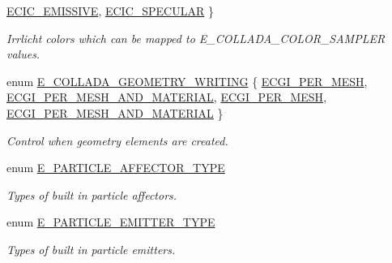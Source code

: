\begin{DoxyCompactItemize}
\hyperlink{namespaceirr_1_1scene_a61cba210038d6d843b81d9282f1cac7ea3854a98c9271e12f147fd231281d7b54}{E\+C\+I\+C\+\_\+\+E\+M\+I\+S\+S\+I\+VE}, 
\hyperlink{namespaceirr_1_1scene_a61cba210038d6d843b81d9282f1cac7ea03c5c246d9a435da193eca6a1bca1722}{E\+C\+I\+C\+\_\+\+S\+P\+E\+C\+U\+L\+AR}
 \}\begin{DoxyCompactList}\small\item\em Irrlicht colors which can be mapped to E\+\_\+\+C\+O\+L\+L\+A\+D\+A\+\_\+\+C\+O\+L\+O\+R\+\_\+\+S\+A\+M\+P\+L\+ER values. \end{DoxyCompactList}
\item 
enum \hyperlink{namespaceirr_1_1scene_a179008e7c02889459edf81394dbd6959}{E\+\_\+\+C\+O\+L\+L\+A\+D\+A\+\_\+\+G\+E\+O\+M\+E\+T\+R\+Y\+\_\+\+W\+R\+I\+T\+I\+NG} \{ \hyperlink{namespaceirr_1_1scene_a179008e7c02889459edf81394dbd6959a3e88c7e85ad953d279e36e9e68658ef2}{E\+C\+G\+I\+\_\+\+P\+E\+R\+\_\+\+M\+E\+SH}, 
\hyperlink{namespaceirr_1_1scene_a179008e7c02889459edf81394dbd6959ae673e963bed1f4bea0acbe4c02fe23de}{E\+C\+G\+I\+\_\+\+P\+E\+R\+\_\+\+M\+E\+S\+H\+\_\+\+A\+N\+D\+\_\+\+M\+A\+T\+E\+R\+I\+AL}, 
\hyperlink{namespaceirr_1_1scene_a179008e7c02889459edf81394dbd6959a3e88c7e85ad953d279e36e9e68658ef2}{E\+C\+G\+I\+\_\+\+P\+E\+R\+\_\+\+M\+E\+SH}, 
\hyperlink{namespaceirr_1_1scene_a179008e7c02889459edf81394dbd6959ae673e963bed1f4bea0acbe4c02fe23de}{E\+C\+G\+I\+\_\+\+P\+E\+R\+\_\+\+M\+E\+S\+H\+\_\+\+A\+N\+D\+\_\+\+M\+A\+T\+E\+R\+I\+AL}
 \}\begin{DoxyCompactList}\small\item\em Control when geometry elements are created. \end{DoxyCompactList}
\item 
\mbox{\label{namespaceirr_1_1scene_a34c0f9475cfcbda8b50ad816a046010b}} 
enum \hyperlink{namespaceirr_1_1scene_a34c0f9475cfcbda8b50ad816a046010b}{E\+\_\+\+P\+A\+R\+T\+I\+C\+L\+E\+\_\+\+A\+F\+F\+E\+C\+T\+O\+R\+\_\+\+T\+Y\+PE} \begin{DoxyCompactList}\small\item\em Types of built in particle affectors. \end{DoxyCompactList}
\item 
\mbox{\label{namespaceirr_1_1scene_a3e251a881c886884a78adea2e546272b}} 
enum \hyperlink{namespaceirr_1_1scene_a3e251a881c886884a78adea2e546272b}{E\+\_\+\+P\+A\+R\+T\+I\+C\+L\+E\+\_\+\+E\+M\+I\+T\+T\+E\+R\+\_\+\+T\+Y\+PE} \begin{DoxyCompactList}\small\item\em Types of built in particle emitters. \end{DoxyCompactList}

\end{DoxyCompactItemize}
